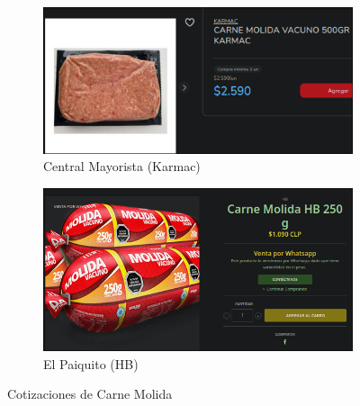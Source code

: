 \documentclass[12pt]{article}
\begin{document}
    \begin{figure}[H]
        \centering
        \begin{subfigure}{0.48\textwidth}
            \centering
            \includegraphics[width=\linewidth]{central} %
            \caption{Central Mayorista (Karmac)}
            \label{fig:central_mayorista_carne}
        \end{subfigure}
        \hfill
        \begin{subfigure}{0.48\textwidth}
            \centering
            \includegraphics[width=\linewidth]{paiquito}
            \caption{El Paiquito (HB)}
            \label{fig:paiquito}
        \end{subfigure}
        \caption{Cotizaciones de Carne Molida}
        \label{fig:cotizaciones_carne_molida}
    \end{figure}
\end{document}
